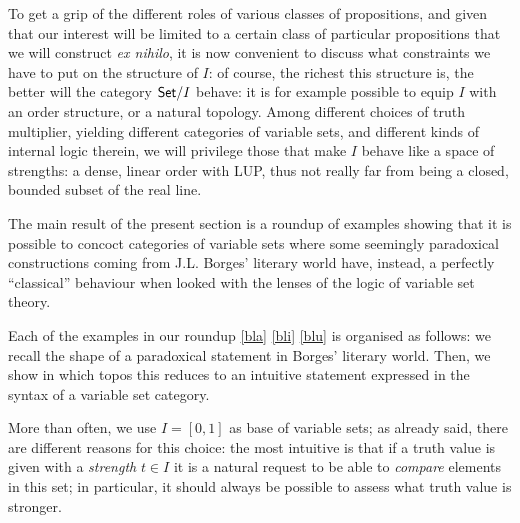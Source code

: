 To get a grip of the different roles of various classes of propositions, and given that our interest will be limited to a certain class of particular propositions that we will construct \emph{ex nihilo}, it is now convenient to discuss what constraints we have to put on the structure of $I$: of course, the richest this structure is, the better will the category $\mathsf{Set}/I$ behave: it is for example possible to equip $I$ with an order structure, or a natural topology. Among different choices of truth multiplier, yielding different categories of variable sets, and different kinds of internal logic therein, we will privilege those that make $I$ behave like a space of strengths: a dense, linear order with LUP, thus not really far from being a closed, bounded subset of the real line.

The main result of the present section is a roundup of examples showing that it is possible to concoct categories of variable sets where some seemingly paradoxical constructions coming from J.L. Borges' literary world have, instead, a perfectly ``classical'' behaviour when looked with the lenses of the logic of variable set theory.

Each of the examples in our roundup \autoref{bla} \autoref{bli} \autoref{blu} is organised as follows: we recall the shape of a paradoxical statement in Borges' literary world. Then, we show in which topos this reduces to an intuitive statement expressed in the syntax of a variable set category.

More than often, we use $I=[0,1]$ as base of variable sets; as already said, there are different reasons for this choice: the most intuitive is that if a truth value is given with a \emph{strength} $t\in I$ it is a natural request to be able to \emph{compare} elements in this set; in particular, it should always be possible to assess what truth value is stronger.

